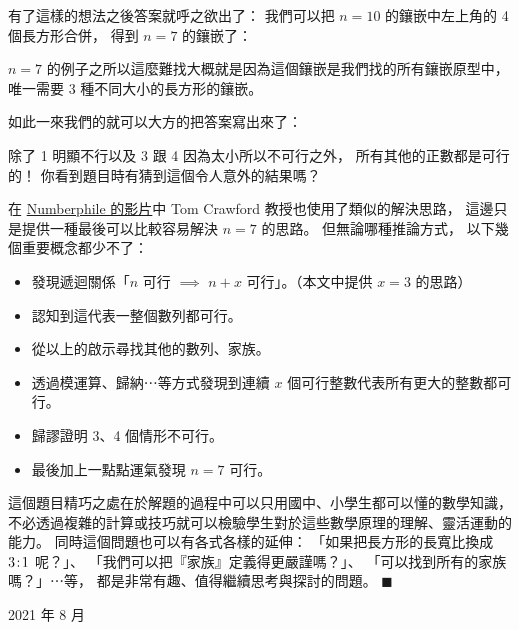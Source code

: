 \documentclass{article}
\begin{document}
\begin{multicols*}{2}

有了這樣的想法之後答案就呼之欲出了：
我們可以把 $n=10$ 的鑲嵌中左上角的 4 個長方形合併，
得到 $n=7$ 的鑲嵌了：


\noindent
$n=7$ 的例子之所以這麼難找大概就是因為這個鑲嵌是我們找的所有鑲嵌原型中，
唯一需要 3 種不同大小的長方形的鑲嵌。

如此一來我們的就可以大方的把答案寫出來了：


\noindent
除了 1 明顯不行以及 3 跟 4 因為太小所以不可行之外，
所有其他的正數都是可行的！
你看到題目時有猜到這個令人意外的結果嗎？

\separationline

在 \href{https://www.youtube.com/watch?v=VZ25tZ9z6uI}{Numberphile 的影片}中
Tom Crawford 教授也使用了類似的解決思路，
這邊只是提供一種最後可以比較容易解決 $n=7$ 的思路。
但無論哪種推論方式，
以下幾個重要概念都少不了：
\begin{itemize}
	\item
		發現遞迴關係「$n$ 可行 $\implies$ $n+x$ 可行」。（本文中提供 $x=3$ 的思路）
	\item
		認知到這代表一整個數列都可行。
	\item
		從以上的啟示尋找其他的數列、家族。
	\item
		透過模運算、歸納⋯等方式發現到連續 $x$ 個可行整數代表所有更大的整數都可行。
	\item
		歸謬證明 3、4 個情形不可行。
	\item
		最後加上一點點運氣發現 $n=7$ 可行。
\end{itemize}
這個題目精巧之處在於解題的過程中可以只用國中、小學生都可以懂的數學知識，
不必透過複雜的計算或技巧就可以檢驗學生對於這些數學原理的理解、靈活運動的能力。
同時這個問題也可以有各式各樣的延伸：
「如果把長方形的長寬比換成 $3\!:\!1$ 呢？」、
「我們可以把『家族』定義得更嚴謹嗎？」、
「可以找到所有的家族嗎？」⋯等，
都是非常有趣、值得繼續思考與探討的問題。
\hfill$\blacksquare$

\vfill

\hfill{2021 年 8 月}

\end{multicols*}
\end{document}

